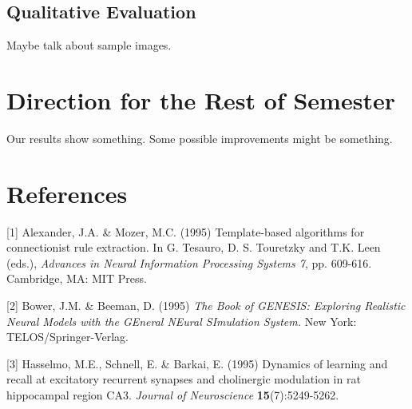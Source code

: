 \documentclass{article} %
\begin{document}
\subsection{Qualitative Evaluation}

Maybe talk about sample images.

\section{Direction for the Rest of Semester}

Our results show something. Some possible improvements might be something.

\section*{References}

\small{
[1] Alexander, J.A. \& Mozer, M.C. (1995) Template-based algorithms
for connectionist rule extraction. In G. Tesauro, D. S. Touretzky
and T.K. Leen (eds.), {\it Advances in Neural Information Processing
Systems 7}, pp. 609-616. Cambridge, MA: MIT Press.

[2] Bower, J.M. \& Beeman, D. (1995) {\it The Book of GENESIS: Exploring
Realistic Neural Models with the GEneral NEural SImulation System.}
New York: TELOS/Springer-Verlag.

[3] Hasselmo, M.E., Schnell, E. \& Barkai, E. (1995) Dynamics of learning
and recall at excitatory recurrent synapses and cholinergic modulation
in rat hippocampal region CA3. {\it Journal of Neuroscience}
{\bf 15}(7):5249-5262.
}
\end{document}
